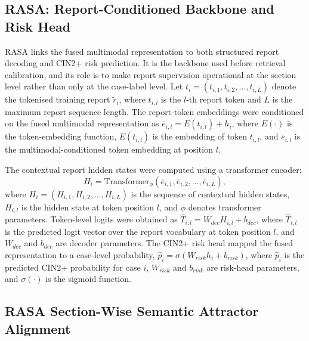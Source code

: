 \documentclass[11pt, a4paper]{article}
\theoremstyle{plain}
\theoremstyle{definition}
\begin{document}
\subsection{RASA: Report-Conditioned Backbone and Risk Head}
\label{subsec:methods_rasa}

RASA links the fused multimodal representation to both structured report decoding and CIN2+ risk prediction. It is the backbone used before retrieval calibration, and its role is to make report supervision operational at the section level rather than only at the case-label level. Let \(t_i=(t_{i,1},t_{i,2},\ldots,t_{i,L})\) denote the tokenised training report \(\tilde{r}_i\), where \(t_{i,l}\) is the \(l\)-th report token and \(L\) is the maximum report sequence length. The report-token embeddings were conditioned on the fused multimodal representation as \(\bar{e}_{i,l}=E(t_{i,l})+h_i\), where \(E(\cdot)\) is the token-embedding function, \(E(t_{i,l})\) is the embedding of token \(t_{i,l}\), and \(\bar{e}_{i,l}\) is the multimodal-conditioned token embedding at position \(l\).

The contextual report hidden states were computed using a transformer encoder:
\begin{equation}
H_i=
\mathrm{Transformer}_{\phi}(\bar{e}_{i,1},\bar{e}_{i,2},\ldots,\bar{e}_{i,L}),
\end{equation}
where \(H_i=(H_{i,1},H_{i,2},\ldots,H_{i,L})\) is the sequence of contextual hidden states, \(H_{i,l}\) is the hidden state at token position \(l\), and \(\phi\) denotes transformer parameters. Token-level logits were obtained as \(\hat{T}_{i,l}=W_{dec}H_{i,l}+b_{dec}\), where \(\hat{T}_{i,l}\) is the predicted logit vector over the report vocabulary at token position \(l\), and \(W_{dec}\) and \(b_{dec}\) are decoder parameters. The CIN2+ risk head mapped the fused representation to a case-level probability, \(\hat{p}_i=\sigma(W_{risk}h_i+b_{risk})\), where \(\hat{p}_i\) is the predicted CIN2+ probability for case \(i\), \(W_{risk}\) and \(b_{risk}\) are risk-head parameters, and \(\sigma(\cdot)\) is the sigmoid function.

\subsection{RASA Section-Wise Semantic Attractor Alignment}
\label{subsec:methods_section_alignment}
\end{document}
